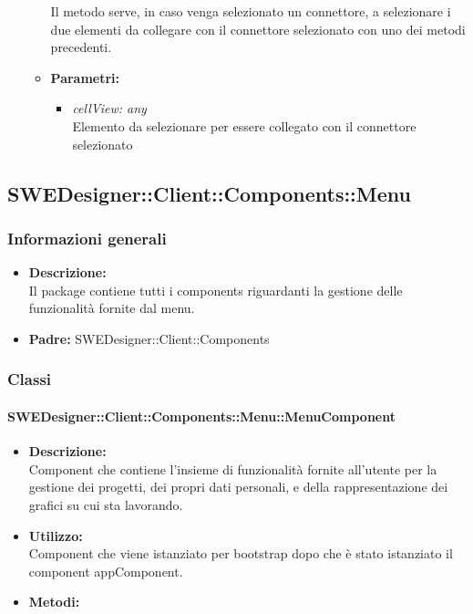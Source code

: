 \begin{itemize}
\begin{itemize}
          				Il metodo serve, in caso venga selezionato un connettore, a selezionare i due elementi da collegare con il connettore selezionato con uno dei metodi precedenti.
          				\item \textbf{Parametri:}\\
            				\begin{itemize}
            					\item \emph{cellView: any}\\
            					Elemento da selezionare per essere collegato con il connettore selezionato
            				\end{itemize}
          			\end{itemize}
          		\end{itemize}
	\subsection{SWEDesigner::Client::Components::Menu}
		\subsubsection{Informazioni generali}
			\begin{itemize}
          		\item \textbf{Descrizione:}\\
          		Il package contiene tutti i components riguardanti la gestione delle funzionalità fornite dal menu.
          		\item \textbf{Padre:} SWEDesigner::Client::Components
          	\end{itemize}
		\subsubsection{Classi}
			\paragraph{SWEDesigner::Client::Components::Menu::MenuComponent}
				\begin{itemize}
          			\item \textbf{Descrizione:}\\
          			Component che contiene l’insieme di funzionalità fornite all’utente per la gestione dei progetti, dei propri dati personali, e della rappresentazione dei grafici su cui sta lavorando.
          			\item \textbf{Utilizzo:}\\
          			Component che viene istanziato per bootstrap dopo che è stato istanziato il component appComponent.
          			\item \textbf{Metodi:}\\
          		\end{itemize}
